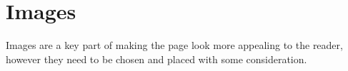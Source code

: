 \chapter{Images}

Images are a key part of making the page look more appealing to the reader, however they need to be chosen and placed with some consideration.
